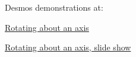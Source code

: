\documentclass{ximera}
\begin{document}
Desmos demonstrations at:


\href{https://www.desmos.com/3d/31f1fd3ffd}{Rotating about an axis}


\href{https://www.desmos.com/3d/a82ef238da}{Rotating about an axis, slide show}




\end{document}
